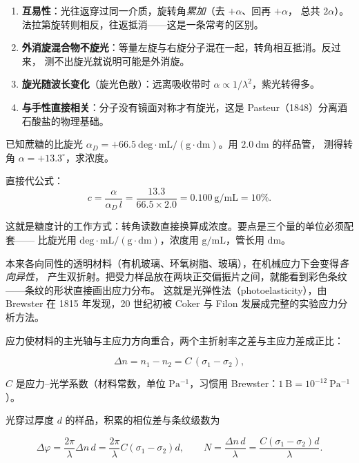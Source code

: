\documentclass[11pt]{ctexart}
\let\subhdrtheme\subhdr
\renewcommand{\subhdr}[1]{\needspace{4\baselineskip}\subhdrtheme{#1}}
\let\hdrorig\hdr
\renewcommand{\hdr}[2]{\needspace{11\baselineskip}\hdrorig{#1}{#2}}
\begin{document}
\begin{enumerate}[label=\arabic*.,leftmargin=1.8em]
\item \textbf{互易性}：光往返穿过同一介质，旋转角\emph{累加}（去 $+\alpha$、回再 $+\alpha$，
总共 $2\alpha$）。法拉第旋转则相反，往返抵消——这是一条常考的区别。
\item \textbf{外消旋混合物不旋光}：等量左旋与右旋分子混在一起，转角相互抵消。反过来，
测不出旋光就说明可能是外消旋。
\item \textbf{旋光随波长变化}（旋光色散）：远离吸收带时 $\alpha\propto1/\lambda^2$，紫光转得多。
\item \textbf{与手性直接相关}：分子没有镜面对称才有旋光，这是 Pasteur（1848）分离酒石酸盐的物理基础。
\end{enumerate}


已知蔗糖的比旋光 $\alpha_D=+66.5\ \mathrm{deg\cdot mL/(g\cdot dm)}$。用 $2.0\ \mathrm{dm}$ 的样品管，
测得转角 $\alpha=+13.3^\circ$，求浓度。

直接代公式：
\[
c=\frac{\alpha}{\alpha_D\,l}=\frac{13.3}{66.5\times2.0}=0.100\ \mathrm{g/mL}=10\%.
\]

这就是糖度计的工作方式：转角读数直接换算成浓度。要点是三个量的单位必须配套——
比旋光用 $\mathrm{deg\cdot mL/(g\cdot dm)}$，浓度用 $\mathrm{g/mL}$，管长用 $\mathrm{dm}$。



本来各向同性的透明材料（有机玻璃、环氧树脂、玻璃），在机械应力下会变得\emph{各向异性}，
产生双折射。把受力样品放在两块正交偏振片之间，就能看到彩色条纹——条纹的形状直接画出应力分布。
这就是光弹性法（photoelasticity），由 Brewster 在 1815 年发现，20 世纪初被 Coker 与 Filon
发展成完整的实验应力分析方法。


应力使材料的主光轴与主应力方向重合，两个主折射率之差与主应力差成正比：

\[
\Delta n=n_1-n_2=C\,(\sigma_1-\sigma_2),
\]

$C$ 是应力--光学系数（材料常数，单位 $\mathrm{Pa^{-1}}$，习惯用 Brewster：$1\ \mathrm{B}=10^{-12}\ \mathrm{Pa^{-1}}$）。

光穿过厚度 $d$ 的样品，积累的相位差与条纹级数为

\[
\Delta\varphi=\frac{2\pi}{\lambda}\Delta n\,d
=\frac{2\pi}{\lambda}C(\sigma_1-\sigma_2)d,
\qquad
N=\frac{\Delta n\,d}{\lambda}=\frac{C(\sigma_1-\sigma_2)d}{\lambda}.
\]
\end{document}
